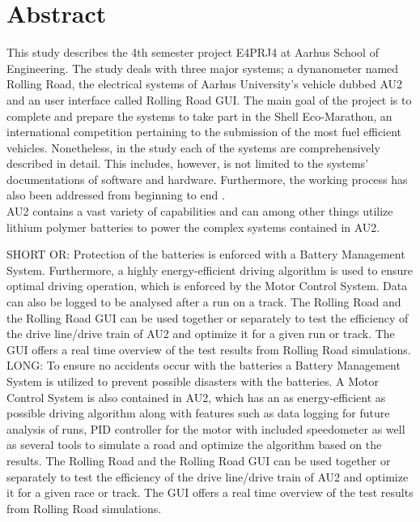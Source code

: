 \chapter{Abstract}
This study describes the 4th semester project E4PRJ4 at Aarhus School of Engineering. The study deals with three major systems; a dynanometer named Rolling Road, the electrical systems of Aarhus University's vehicle dubbed AU2 and an user interface called Rolling Road GUI. The main goal of the project is to complete and prepare the systems to take part in the Shell Eco-Marathon, an international competition pertaining to the submission of the most fuel efficient vehicles. Nonetheless, in the study  each of the systems are comprehensively described in detail. This includes, however, is not limited to the systems' documentations of  software and hardware. Furthermore, the working process has also been addressed from beginning to end . \\
AU2 contains a vast variety of capabilities and can among other things utilize lithium polymer batteries to power the complex systems contained in AU2.

SHORT OR:
Protection of the batteries is enforced with a Battery Management System. Furthermore, a highly energy-efficient driving algorithm is used to ensure optimal driving operation, which is enforced by the Motor Control System. Data can also be logged to be analysed after a run on a track.
The Rolling Road and the Rolling Road GUI can be used together or separately to test the efficiency of the drive line/drive train of AU2 and optimize it for a given run or track. The GUI offers a real time overview of the test results from Rolling Road simulations.\\

LONG:
To ensure no accidents occur with the batteries a Battery Management System is utilized to prevent possible disasters with the batteries. A Motor Control System is also contained in AU2, which has an as energy-efficient as possible driving algorithm along with features such as data logging for future analysis of runs, PID controller for the motor with included speedometer as well as several tools to simulate a road and optimize the algorithm based on the results. The Rolling Road and the Rolling Road GUI can be used together or separately to test the efficiency of the drive line/drive train of AU2 and optimize it for a given race or track. The GUI offers a real time overview of the test results from Rolling Road simulations.\\

